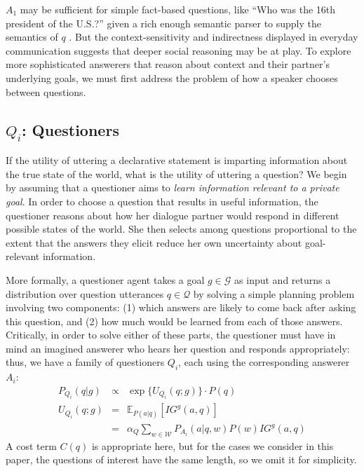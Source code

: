\documentclass[11pt, floatsintext]{apa6}
\newcommand{\E}[2]{\ensuremath{\mathbb{E}_{#1}\left [#2 \right]}}
\begin{document}
$A_1$ may be sufficient for simple fact-based questions, like ``Who was the 16th president of the U.S.?'' given a rich enough semantic parser to supply the semantics of $q$ \cite{BerantChouFrostigLiang13_FreebaseQAPairs}. 
But the context-sensitivity and indirectness displayed in everyday communication suggests that deeper social reasoning may be at play. 
To explore more sophisticated answerers that reason about context and their partner's underlying goals, we must first address the problem of how a speaker chooses between questions.

\subsection{$Q_i$: Questioners}

If the utility of uttering a declarative statement is imparting information about the true state of the world, what is the utility of uttering a question? We begin by assuming that a questioner aims to \emph{learn information relevant to a private goal}.
%
In order to choose a question that results in useful information, the questioner reasons about how her dialogue partner would respond in different possible states of the world. 
She then selects among questions proportional to the extent that the answers they elicit reduce her own uncertainty about goal-relevant information.
%


More formally, a questioner agent takes a goal $g \in \mathcal{G}$ as input and returns a distribution over question utterances $q \in \mathcal{Q}$ by solving a simple planning problem involving two components: (1) which answers are likely to come back after asking this question, and (2) how much would be learned from each of those answers. Critically, in order to solve either of these parts, the questioner must have in mind an imagined answerer who hears her question and responds appropriately: thus, we have a family of questioners $Q_i$, each using the corresponding answerer $A_i$:
%
$$
\begin{array}{lcl}
P_{Q_i}(q|g)  & \propto & \exp\{U_{Q_i}(q;g)\} \cdot P(q)\\
U_{Q_i}(q;g) & = & \E{P(a|q)}{IG^g(a,q)}\\
	 & = & \alpha_Q \sum_{w\in\mathcal{W}} P_{A_i}(a|q,w)P(w) IG^g(a,q) 
\end{array}
$$
%
A cost term $C(q)$ is appropriate here, but for the cases we consider in this paper, the questions of interest have the same length, so we omit it for simplicity.
\end{document}
